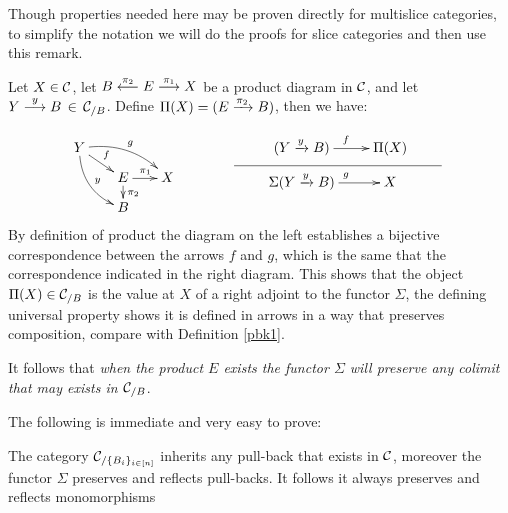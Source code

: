 Though properties needed here may be proven directly for multislice categories, to simplify the notation we will do the proofs for slice categories and then use this remark.



%

\begin{remark} \label{adjuntoderecha}
Let $X \in \mathcal{C}$, let  
$B \overset {\pi_2} {\longleftarrow} E \overset {\pi_1} {\longrightarrow}  X$ be a product diagram in $\mathcal{C}$, and let 
$Y \overset {y} {\longrightarrow} B \, \in \, \mathcal{C}_{/B}$.  Define $\Pi(X) = (E \xrightarrow{\pi_2} B)$, then we have:

$$
\xymatrix@C=4ex@R=2ex
     {
      Y \ar@/^0.8pc/[drr]^{g}
        \ar@/_0.8pc/[ddr]^{y} 
        \ar[dr]^f
    \\
    & E \ar[d]^{\pi_2}
        \ar[r]^{\pi_1}
    & X
   \\
    & B
     }
\hspace{8ex} 
\xymatrix@C=5ex@R=0ex
     {
      & (Y \xr{y} B) \ar[r]^f  &  \Pi(X) %
     \\
     {} \ar@{-}[rrr] &&& {}
     \\
      & \Sigma(Y \xr{y} B)  \ar[r]^g & X
     }
$$    
By definition of product the diagram on the left establishes a bijective correspondence between the arrows $f$ and $g$, which is the same that the  correspondence  indicated in the right diagram. This shows that the object $\Pi(X) \in \mathcal{C}_{/B}$ is the value at $X$ of a right adjoint to the functor $\Sigma$, the defining universal property shows it is defined in arrows in a way that preserves composition, compare with Definition \ref{pbk1}.
 
It follows that \emph{when the product $E$ exists the functor $\Sigma$ will preserve any colimit that may exists in $\mathcal{C}_{/B}$}.


 \cqd
\end{remark}

The following is immediate and very easy to prove:
{
\begin{proposition}\label{p-pulback}
The category  $\mathcal{C}_{/\{B_i\}_{ i \in [n]}}$ inherits any pull-back that exists in $\mathcal{C}$, moreover the functor $\Sigma$ preserves and reflects pull-backs. It follows it always preserves and reflects monomorphisms \cqd
\end{proposition} 
}

